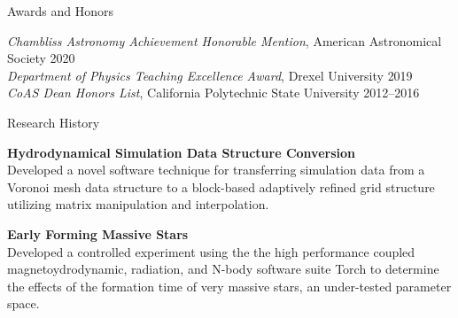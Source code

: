 \documentclass{resume} %
\begin{document}

\begin{rSection}{Awards and Honors}

\textit{Chambliss Astronomy Achievement Honorable Mention}, American Astronomical Society \hfill{2020} \\
\textit{Department of Physics Teaching Excellence Award}, Drexel University \hfill{2019} \\
\textit{CoAS Dean Honors List}, California Polytechnic State University \hfill {2012--2016}

\end{rSection}


\begin{rSection}{Research History}

\begin{description}[leftmargin=8em, style=nextline]

\item[\textnormal{2021-Present}] \textbf{Hydrodynamical Simulation Data Structure Conversion}\\
  Developed a novel software technique for transferring simulation data from a Voronoi mesh data structure to a block-based adaptively refined grid structure utilizing matrix manipulation and interpolation.

\item[\textnormal{2018-Present}] \textbf{Early Forming Massive Stars}\\
  Developed a controlled experiment using the the high performance coupled magnetoydrodynamic, radiation, and N-body software suite Torch to determine the effects of the formation time of very massive stars, an under-tested parameter space.

\end{description}

\end{rSection}

\end{document}
